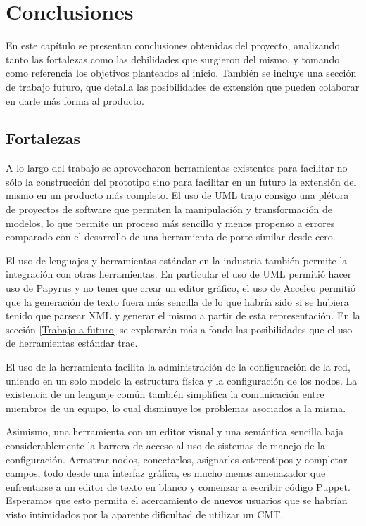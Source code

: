 \chapter{Conclusiones} \label{Conclusiones}

En este capítulo se presentan conclusiones obtenidas del proyecto, analizando tanto las fortalezas como las debilidades que surgieron del mismo, y tomando como referencia los objetivos planteados al inicio. También se incluye una sección de trabajo futuro, que detalla las posibilidades de extensión que pueden colaborar en darle más forma al producto.

\section{Fortalezas}
A lo largo del trabajo se aprovecharon herramientas existentes para facilitar no sólo la construcción del prototipo sino para facilitar en un futuro la extensión del mismo en un producto más completo. El uso de UML trajo consigo una plétora de proyectos de software que permiten la manipulación y transformación de modelos, lo que permite un proceso más sencillo y menos propenso a errores comparado con el desarrollo de una herramienta de porte similar desde cero.

El uso de lenguajes y herramientas estándar en la industria también permite la integración con otras herramientas. En particular el uso de UML permitió hacer uso de Papyrus y no tener que crear un editor gráfico, el uso de Acceleo permitió que la generación de texto fuera más sencilla de lo que habría sido si se hubiera tenido que parsear XML y generar el mismo a partir de esta representación. En la sección \ref{Trabajo a futuro} se explorarán más a fondo las posibilidades que el uso de herramientas estándar trae.

El uso de la herramienta facilita la administración de la configuración de la red, uniendo en un solo modelo la estructura física y la configuración de los nodos. La existencia de un lenguaje común también simplifica la comunicación entre miembros de un equipo, lo cual disminuye los problemas asociados a la misma.

Asimismo, una herramienta con un editor visual y una semántica sencilla baja considerablemente la barrera de acceso al uso de sistemas de manejo de la configuración. Arrastrar nodos, conectarlos, asignarles estereotipos y completar campos, todo desde una interfaz gráfica, es mucho menos amenazador que enfrentarse a un editor de texto en blanco y comenzar a escribir código Puppet. Esperamos que esto permita el acercamiento de nuevos usuarios que se habrían visto intimidados por la aparente dificultad de utilizar un CMT.

